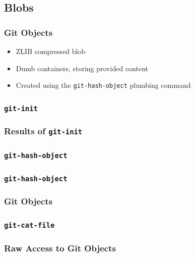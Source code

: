 \documentclass{beamer}
\begin{document}
\subsection{Blobs}
\begin{frame}
\frametitle{Git Objects}
\begin{itemize}
\item{ZLIB compressed blob}
\item{Dumb containers, storing provided content}
\item{Created using the \texttt{git-hash-object} plumbing command}
\end{itemize}
\end{frame}

\begin{frame}[fragile]
\frametitle{\texttt{git-init}}

\end{frame}

\begin{frame}[fragile]
\frametitle{Results of \texttt{git-init}}

\end{frame}

\begin{frame}[fragile]
\frametitle{\texttt{git-hash-object}}

\end{frame}

\begin{frame}[fragile]
\frametitle{\texttt{git-hash-object}}

\end{frame}

\begin{frame}
\frametitle{Git Objects}
\begin{figure}
\end{figure}
\end{frame}


\begin{frame}[fragile]
\frametitle{\texttt{git-cat-file}}

\end{frame}

\begin{frame}[fragile]
\frametitle{Raw Access to Git Objects}

\end{frame}
\end{document}
